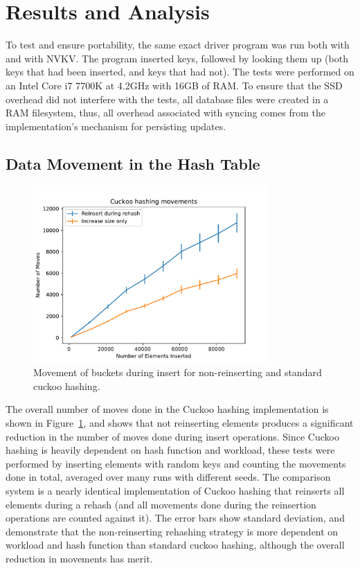 \section{Results and Analysis}

To test and ensure portability, the same exact driver program was run both with
\bdb and with NVKV. The program inserted keys, followed by looking them up (both
keys that had been inserted, and keys that had not). The tests were performed on
an Intel Core i7 7700K at 4.2GHz with 16GB of RAM. To ensure that the SSD
overhead did not interfere with the tests, all database files were created in a
RAM filesystem, thus, all overhead associated with syncing comes from the
implementation's mechanism for persisting updates.

\subsection{Data Movement in the Hash Table}

\begin{figure}
\centering
\hspace*{-0.1in}
\includegraphics[width=90mm]{fig/moves}
\caption{Movement of buckets during insert for non-reinserting and standard
cuckoo hashing.}
\label{fig:moves}
\end{figure}

The overall number of moves done in the Cuckoo hashing implementation is shown
in Figure~\ref{fig:moves}, and shows that not reinserting elements produces a
significant reduction in the number of moves done during insert operations.
Since Cuckoo hashing is heavily dependent on hash function and workload, these
tests were performed by inserting elements with random keys and counting the
movements done in total, averaged over many runs with different seeds.
The comparison system is a nearly identical
implementation of Cuckoo hashing that reinserts all elements during a rehash
(and all movements done during the reinsertion operations are counted against
it).
The error bars show standard deviation, and demonstrate that the non-reinserting
rehashing strategy is more dependent on workload and hash function than standard
cuckoo hashing, although the overall reduction in movements has merit.

